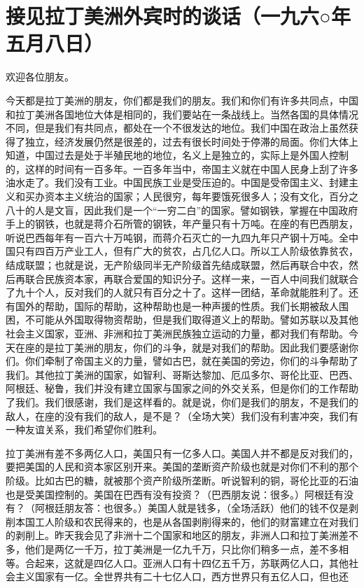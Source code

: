 \section[接见拉丁美洲外宾时的谈话（一九六○年五月八日）]{接见拉丁美洲外宾时的谈话（一九六○年五月八日）}


欢迎各位朋友。

今天都是拉丁美洲的朋友，你们都是我们的朋友。我们和你们有许多共同点，中国和拉丁美洲各国地位大体是相同的，我们要站在一条战线上。当然各国的具体情况不同，但是我们有共同点，都处在一个不很发达的地位。我们中国在政治上虽然获得了独立，经济发展仍然是很差的，过去有很长时间处于停滞的局面。你们大体上知道，中国过去是处于半殖民地的地位，名义上是独立的，实际上是外国人控制的，这样的时间有一百多年。一百多年当中，帝国主义就在中国人民身上刮了许多油水走了。我们没有工业。中国民族工业是受压迫的。中国是受帝国主义、封建主义和买办资本主义统治的国家；人民很穷，每年要饿死很多人；没有文化，百分之八十的人是文盲，因此我们是一个“一穷二白”的国家。譬如钢铁，掌握在中国政府手上的钢铁，也就是蒋介石所管的钢铁，年产量只有十万吨。在座的有巴西朋友，听说巴西每年有一百六十万吨钢，而蒋介石灭亡的一九四九年只产钢十万吨。全中国只有四百万产业工人，但有广大的贫农，占几亿人口。所以工人阶级依靠贫农，结成联盟；也就是说，无产阶级同半无产阶级首先结成联盟，然后再联合中农，然后再联合民族资本家，再联合爱国的知识分子。这样一来，一百人中间我们就联合了九十个人，反对我们的人就只有百分之十了。这样一团结，革命就能胜利了。还有国外的帮助，国际的帮助，这种帮助也是一种声援的性质。我们长期被敌人围困，不可能从外国取得物资帮助，但是我们取得道义上的帮助。譬如苏联以及其他社会主义国家，亚洲、非洲和拉丁美洲民族独立运动的力量，都对我们有帮助。今天在座的是拉丁美洲的朋友，你们的斗争，就是对我们的帮助。因此我们要感谢你们。你们牵制了帝国主义的力量，譬如古巴，就在美国的旁边，你们的斗争帮助了我们。其他拉丁美洲的国家，如智利、哥斯达黎加、厄瓜多尔、哥伦比亚、巴西、阿根廷、秘鲁，我们并没有建立国家与国家之间的外交关系，但是你们的工作帮助了我们。我们很感谢，我们是这样看的。就是说，你们是我们的朋友，不是我们的敌人，在座的没有我们的敌人，是不是？（全场大笑）我们没有利害冲突，我们有一种友谊关系，我们希望你们胜利。

拉丁美洲有差不多两亿人口，美国只有一亿多人口。美国人并不都是反对我们的，要把美国的人民和资本家区别开来。美国的垄断资产阶级也就是对你们不利的那个阶级。比如古巴的糖，就被那个资产阶级所垄断。听说智利的铜，哥伦比亚的石油也是受美国控制的。美国在巴西有没有投资？（巴西朋友说：很多。）阿根廷有没有？（阿根廷朋友答：也很多。）美国人就是钱多，（全场活跃）他们的钱不仅是剥削本国工人阶级和农民得来的，也是从各国剥削得来的，他们的财富建立在对我们的剥削上。昨天我会见了非洲十二个国家和地区的朋友，非洲人口和拉丁美洲差不多，他们是两亿一千万，拉丁美洲是一亿九千万，只比你们稍多一点，差不多相等。合起来，这就是四亿人口。亚洲人口有十四亿五千万，苏联两亿人口，其他社会主义国家有一亿。全世界共有二十七亿人口，西方世界只有五亿人口，但也还

